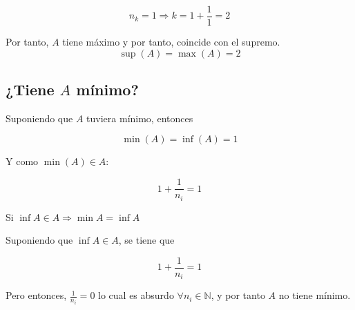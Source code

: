 \documentclass[11pt]{article}
\begin{document}
\[n_k = 1 \Rightarrow k = 1 + \frac{1}{1} = 2\]

Por tanto, $A$ tiene máximo y por tanto, coincide con
el supremo.
\[\sup(A)=\max(A)=2\]

\subsection{¿Tiene $A$ mínimo?}
\label{sec-5-4}

Suponiendo que $A$ tuviera mínimo, entonces

\[\min(A) = \inf(A) = 1\]

Y como $\min(A) \in A$:

\[1 + \frac{1}{n_i} = 1\]

Si $\inf A \in A \Rightarrow \min A = \inf A$

Suponiendo que $\inf A \in A$, se tiene que

\[ 1 + \frac{1}{n_i} = 1\]

Pero entonces, $\frac{1}{n_i} = 0$ lo cual es
absurdo $\forall n_i \in \mathbb{N}$, y por
tanto $A$ no tiene mínimo.
\end{document}

